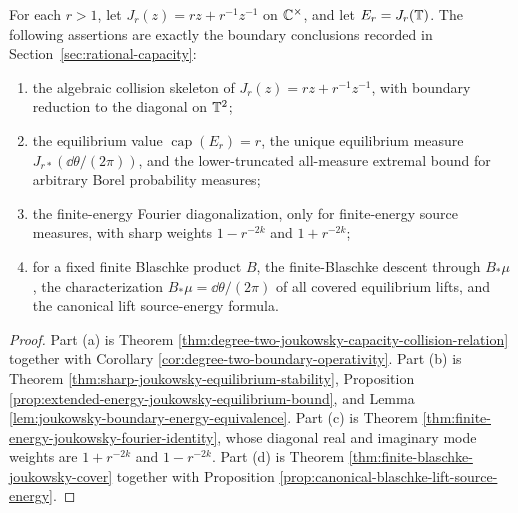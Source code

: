 \begin{corollary}\label{thm:main-joukowsky-boundary-scale}
For each \(r>1\), let \(J_r(z)=rz+r^{-1}z^{-1}\) on
\(\mathbb{C}^\times\), and let \(E_r=J_r(\mathbb{T})\).  The following assertions
are exactly the boundary conclusions recorded in
Section~\ref{sec:rational-capacity}:
\begin{enumerate}[label=\textup{(\alph*)}]
  \item the algebraic collision skeleton of
  \(J_r(z)=rz+r^{-1}z^{-1}\), with boundary reduction to the diagonal on
  \(\mathbb{T}^2\);
  \item the equilibrium value \(\operatorname{cap}(E_r)=r\), the unique
  equilibrium measure \(J_{r\ast}(\dd\theta/(2\pi))\), and the
  lower-truncated all-measure extremal bound for arbitrary Borel
  probability measures;
  \item the finite-energy Fourier diagonalization, only for finite-energy
  source measures, with sharp weights
  \(1-r^{-2k}\) and \(1+r^{-2k}\);
  \item for a fixed finite Blaschke product \(B\), the finite-Blaschke
  descent through \(B_\ast\mu\), the
  characterization \(B_\ast\mu=\dd\theta/(2\pi)\) of all covered
  equilibrium lifts, and the canonical lift source-energy formula.
\end{enumerate}
\end{corollary}

\begin{proof}
Part \textup{(a)} is Theorem
\ref{thm:degree-two-joukowsky-capacity-collision-relation} together with
Corollary \ref{cor:degree-two-boundary-operativity}.  Part \textup{(b)}
is Theorem \ref{thm:sharp-joukowsky-equilibrium-stability}, Proposition
\ref{prop:extended-energy-joukowsky-equilibrium-bound}, and Lemma
\ref{lem:joukowsky-boundary-energy-equivalence}.  Part \textup{(c)} is
Theorem \ref{thm:finite-energy-joukowsky-fourier-identity}, whose
diagonal real and imaginary mode weights are \(1+r^{-2k}\) and
\(1-r^{-2k}\).  Part \textup{(d)} is Theorem
\ref{thm:finite-blaschke-joukowsky-cover} together with Proposition
\ref{prop:canonical-blaschke-lift-source-energy}.
\end{proof}
